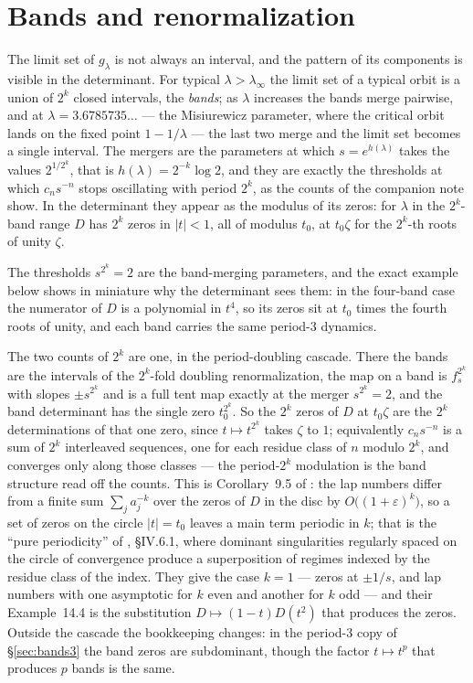 \documentclass[11pt]{article}
\theoremstyle{plain}
\theoremstyle{definition}
\begin{document}
\section{Bands and renormalization}\label{sec:bands}

The limit set of $g_\lambda$ is not always an interval, and the pattern of its components is
visible in the determinant.  For typical $\lambda>\lambda_\infty$ the limit set of a typical
orbit is a union of $2^k$ closed intervals, the \emph{bands}; as $\lambda$ increases the bands
merge pairwise, and at $\lambda=3.6785735\ldots$ --- the Misiurewicz parameter, where the critical orbit
lands on the fixed point $1-1/\lambda$ --- the last two merge and the limit set becomes a single interval.  The mergers are the parameters at
which $s=e^{h(\lambda)}$ takes the values $2^{1/2^k}$, that is $h(\lambda)=2^{-k}\log2$, and
they are exactly the thresholds at which $c_ns^{-n}$ stops oscillating with period $2^k$,
as the counts of the companion note show.  In the determinant they appear as the modulus of its zeros: for
$\lambda$ in the $2^k$-band range $D$ has $2^k$ zeros in $|t|<1$, all of modulus $t_0$, at
$t_0\zeta$ for the $2^k$-th roots of unity $\zeta$.

The thresholds $s^{2^k}=2$ are the band-merging parameters, and the exact example below shows
in miniature why the determinant sees them: in the four-band case the numerator of $D$ is a
polynomial in $t^4$, so its zeros sit at $t_0$ times the fourth roots of unity, and each band
carries the same period-$3$ dynamics.

The two counts of $2^k$ are one, in the period-doubling cascade.  There the bands are the intervals of
the $2^k$-fold doubling renormalization, the map on a band is $f_s^{2^k}$ with slopes
$\pm s^{2^k}$ and is a full tent map exactly at the merger $s^{2^k}=2$, and the band
determinant has the single zero $t_0^{2^k}$.  So the $2^k$ zeros of $D$ at $t_0\zeta$ are the
$2^k$ determinations of that one zero, since $t\mapsto t^{2^k}$ takes $\zeta$ to $1$;
equivalently $c_ns^{-n}$ is a sum of $2^k$ interleaved sequences, one for each residue class
of $n$ modulo $2^k$, and converges only along those classes --- the period-$2^k$ modulation is
the band structure read off the counts.  This is Corollary~9.5 of \cite{MT}: the lap
numbers differ from a finite sum $\sum_j a_j^{-k}$ over the zeros of $D$ in the disc by
$O\bigl((1+\varepsilon)^k\bigr)$, so a set of zeros on the circle $|t|=t_0$ leaves a main term
periodic in $k$; that is the ``pure periodicity'' of \cite{FS}, \S IV.6.1, where dominant singularities
regularly spaced on the circle of convergence produce a superposition of regimes indexed by the
residue class of the index.  They give the case $k=1$ --- zeros at $\pm1/s$, and lap numbers with one
asymptotic for $k$ even and another for $k$ odd --- and their Example~14.4 is the
substitution $D\mapsto(1-t)D(t^2)$ that produces the zeros.  Outside the cascade the
bookkeeping changes: in the period-$3$ copy of \S\ref{sec:bands3} the band zeros are
subdominant, though the factor $t\mapsto t^p$ that produces $p$ bands is the same.
\end{document}
